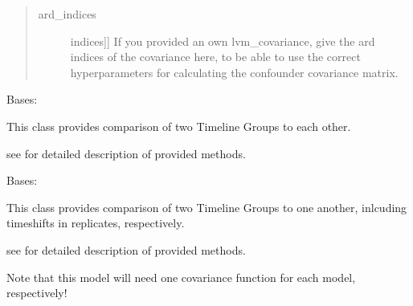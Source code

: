 \documentclass[letterpaper,10pt,english]{sphinxmanual}
\begin{document}
\begin{fulllineitems}
\begin{fulllineitems}
\begin{quote}
\begin{description}
\item[{ard\_indices}] \leavevmode{[}{[}indices{]}{]}
If you provided an own lvm\_covariance, give the ard indices of the covariance here,
to be able to use the correct hyperparameters for calculating the confounder covariance matrix.

\end{description}
\end{quote}

\end{fulllineitems}


\end{fulllineitems}


\begin{fulllineitems}
\label{base:gptwosample.twosample.twosample_base.TwoSampleShare}
Bases: {\hyperref[base:gptwosample.twosample.twosample_base.TwoSampleBase]{}}

This class provides comparison of two Timeline Groups to each other.

see {\hyperref[base:gptwosample.twosample.twosample_base.TwoSampleBase]{}} for detailed description of provided methods.

\end{fulllineitems}


\begin{fulllineitems}
\label{base:gptwosample.twosample.twosample_base.TwoSampleSeparate}
Bases: {\hyperref[base:gptwosample.twosample.twosample_base.TwoSampleBase]{}}

This class provides comparison of two Timeline Groups to one another, inlcuding timeshifts in replicates, respectively.

see {\hyperref[base:gptwosample.twosample.twosample_base.TwoSampleBase]{}} for detailed description of provided methods.

Note that this model will need one covariance function for each model, respectively!

\end{fulllineitems}
\end{document}
